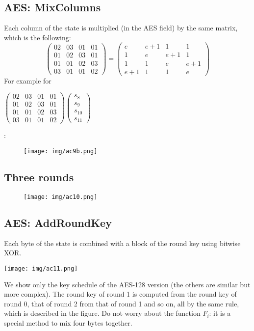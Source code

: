 \documentclass[a4paper, 10pt, titlepage]{article}
\begin{document}
\subsection{AES: MixColumns}
Each column of the state is multiplied (in the AES field) by the same
matrix, which is the following: 
$$ \left(
\begin{matrix}
02 & 03 & 01 & 01 \\
01 & 02 & 03 & 01 \\
01 & 01 & 02 & 03 \\
03 & 01 & 01 & 02 
\end{matrix} \right) = \left(
\begin{matrix}
e & e+1 & 1 & 1 \\
1 & e & e+1 & 1 \\
1 & 1 & e & e+1 \\
e+1 & 1 & 1 & e 
\end{matrix} \right)
$$
For example for \begin{footnotesize}
$\left(\begin{matrix}
02 & 03 & 01 & 01 \\
01 & 02 & 03 & 01 \\
01 & 01 & 02 & 03 \\
03 & 01 & 01 & 02 
\end{matrix}\right) \left( \begin{matrix}
s_8 \\
s_9 \\
s_{10} \\
s_{11} 
\end{matrix} \right)$
\end{footnotesize}:
\begin{figure}[h]
\centering
\texttt{[image: img/ac9b.png]}
\end{figure}
\subsection*{Three rounds}
\begin{figure}[h]
\centering
\texttt{[image: img/ac10.png]}
\end{figure}

\subsection{AES: AddRoundKey}
Each byte of the state is combined with a block of the round key using bitwise XOR.
\begin{center}
\centering \texttt{[image: img/ac11.png]}
\end{center}
We show only the key schedule of the AES-128 version (the others are similar but more complex).  The round key of round 1 is computed from the round key of round 0, that of round 2 from that of round 1   and so on, all by the same rule, which is described in the figure. Do not worry about the function $F_i$: it is a special method to mix four bytes together.
\end{document}
